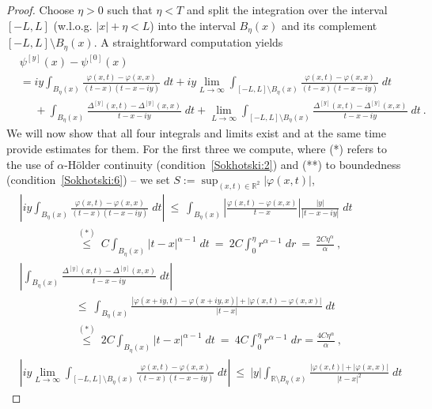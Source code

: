 \documentclass[12pt]{article}
\theoremstyle{plain}
\theoremstyle{definition}
\numberwithin{equation}{section}
\numberwithin{theorem}{section}
\begin{document}
\begin{proof}
Choose $\eta>0$ such that $\eta<T$ and split the integration over the interval $[-L,L]$ (w.l.o.g. $|x|+\eta<L$) into the interval $B_\eta(x)$
and its complement $[-L,L]\setminus B_\eta(x)$. A straightforward computation yields
\begin{align}
&\psi^{[y]}(x)-\psi^{[0]}(x)
\nonumber\\
&=   iy\int_{B_\eta(x)} \frac{\varphi(x,t)-\varphi(x,x)}{(t-x)(t-x-iy)}\;dt + iy\lim_{L\rightarrow\infty}\int_{[-L,L]\setminus B_\eta(x)} \frac{\varphi(x,t)-\varphi(x,x)}{(t-x)(t-x-iy)}\;dt 
\nonumber\\
&\phantom{=}+ \int_{B_\eta(x)} \frac{\Delta^{[y]}(x,t)-\Delta^{[y]}(x,x)}{t-x-iy} \;dt +  \lim_{L\rightarrow\infty}\int_{[-L,L]\setminus B_\eta(x)} \frac{\Delta^{[y]}(x,t)-\Delta^{[y]}(x,x)}{t-x-iy} \;dt \ .
\end{align}
We will now show that all four integrals and limits exist and at the same time provide estimates for them. For the first three we compute, where (*) refers to the use of $\alpha$-H\"older continuity (condition~\ref{Sokhotski:2}) and (**) to boundedness (condition~\ref{Sokhotski:6}) -- we set $S := \sup_{(x,t)\in\mathbb{R}^2}|\varphi(x,t)|$,
\allowdisplaybreaks
\begin{align}
&\left|iy\int_{B_\eta(x)} \frac{\varphi(x,t)-\varphi(x,x)}{(t-x)(t-x-iy)}\;dt\right| 
~\leq~ 
\int_{B_\eta(x)} \left|\frac{\varphi(x,t)-\varphi(x,x)}{t-x}\right|\frac{|y|}{|t-x-iy|}\;dt 
\nonumber \\
& \hspace{5em}
\overset{(*)}{\leq} ~C \int_{B_\eta(x)} |t-x|^{\alpha-1} \;dt 
~=~ 
2C \int_0^\eta r^{\alpha-1} \;dr 
~=~ 
\frac{2C\eta^\alpha}{\alpha} 
\ ,
\\
&
\left|\int_{B_\eta(x)} \frac{\Delta^{[y]}(x,t)-\Delta^{[y]}(x,x)}{t-x-iy} \;dt\right|
\nonumber \\
& \hspace{5em}
\leq~ \int_{B_\eta(x)} \frac{\left|\varphi(x+iy,t)-\varphi(x+iy,x)\right|+\left|\varphi(x,t)-\varphi(x,x)\right|}{\left|t-x\right|}\;dt \nonumber \\ 
& \hspace{5em}
\overset{(*)}{\leq}~ 2C  \int_{B_\eta(x)} |t-x|^{\alpha-1} \;dt 
~=~ 
4C \int_0^\eta r^{\alpha-1} \;dr = \frac{4C\eta^\alpha}{\alpha} 
\ ,
\\
&
\left| iy\lim_{L\rightarrow\infty}\int_{[-L,L]\setminus B_\eta(x)} \frac{\varphi(x,t)-\varphi(x,x)}{(t-x)(t-x-iy)}\;dt \right| 
~\leq~ |y|\int_{\mathbb{R}\setminus B_\eta(x)} \frac{|\varphi(x,t)|+|\varphi(x,x)|}{\left|t-x\right|^2}\;dt \nonumber

\end{align}
\end{proof}
\end{document}
